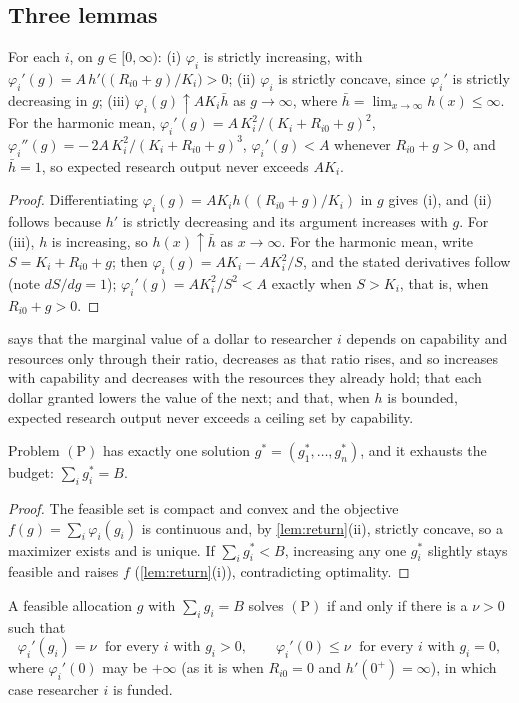 \subsection*{Three lemmas}

\begin{lemma}\label{lem:return}
For each $i$, on $g \in [0, \infty)$: (i) $\varphi_i$ is strictly increasing, with $\varphi_i'(g) = A\,h'\!\big((R_{i0} + g)/K_i\big) > 0$; (ii) $\varphi_i$ is strictly concave, since $\varphi_i'$ is strictly decreasing in $g$; (iii) $\varphi_i(g) \uparrow A K_i \bar h$ as $g \to \infty$, where $\bar h = \lim_{x \to \infty} h(x) \leq \infty$. For the harmonic mean, $\varphi_i'(g) = A\,K_i^2/(K_i + R_{i0} + g)^2$, $\varphi_i''(g) = -\,2A\,K_i^2/(K_i + R_{i0} + g)^3$, $\varphi_i'(g) < A$ whenever $R_{i0} + g > 0$, and $\bar h = 1$, so expected research output never exceeds $AK_i$.
\end{lemma}

\begin{proof}
Differentiating $\varphi_i(g) = A K_i h((R_{i0} + g)/K_i)$ in $g$ gives (i), and (ii) follows because $h'$ is strictly decreasing and its argument increases with $g$. For (iii), $h$ is increasing, so $h(x) \uparrow \bar h$ as $x \to \infty$. For the harmonic mean, write $S = K_i + R_{i0} + g$; then $\varphi_i(g) = AK_i - AK_i^2/S$, and the stated derivatives follow (note $dS/dg = 1$); $\varphi_i'(g) = AK_i^2/S^2 < A$ exactly when $S > K_i$, that is, when $R_{i0} + g > 0$.
\end{proof}

 says that the marginal value of a dollar to researcher $i$ depends on capability and resources only through their ratio, decreases as that ratio rises, and so increases with capability and decreases with the resources they already hold; that each dollar granted lowers the value of the next; and that, when $h$ is bounded, expected research output never exceeds a ceiling set by capability.

\begin{lemma}\label{lem:existence}
Problem $(\mathrm{P})$ has exactly one solution $g^* = (g_1^*, \ldots, g_n^*)$, and it exhausts the budget: $\sum_i g_i^* = B$.
\end{lemma}
\begin{proof}
The feasible set is compact and convex and the objective $f(g) = \sum_i \varphi_i(g_i)$ is continuous and, by \cref{lem:return}(ii), strictly concave, so a maximizer exists and is unique. If $\sum_i g_i^* < B$, increasing any one $g_i^*$ slightly stays feasible and raises $f$ (\cref{lem:return}(i)), contradicting optimality.
\end{proof}
\begin{lemma}\label{lem:emv}
A feasible allocation $g$ with $\sum_i g_i = B$ solves $(\mathrm{P})$ if and only if there is a $\nu > 0$ such that
\[
\varphi_i'(g_i) = \nu \;\text{ for every } i \text{ with } g_i > 0, \qquad \varphi_i'(0) \leq \nu \;\text{ for every } i \text{ with } g_i = 0,
\]
where $\varphi_i'(0)$ may be $+\infty$ (as it is when $R_{i0} = 0$ and $h'(0^+) = \infty$), in which case researcher $i$ is funded.
\end{lemma}

